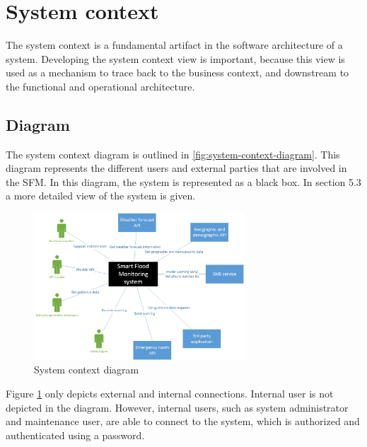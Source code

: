 \section{System context}
\label{sec:system-context}
The system context is a fundamental artifact in the software architecture of a system. Developing the system context view is important, because this view is used as a mechanism to trace back to the business context, and downstream to the functional and operational architecture.

\subsection{Diagram}
\label{subsec:system-diagram}
The system context diagram is outlined in \autoref{fig:system-context-diagram}. This diagram represents the different users and external parties that are involved in the SFM. In this diagram, the system is represented as a black box. In section 5.3 a more detailed view of the system is given. 

\begin{figure}[H]
	\centering
	\includegraphics[keepaspectratio=true,width=0.7\textwidth]{images/system_context.png}
	\caption{System context diagram}
	\label{fig:system-context-diagram}
\end{figure}

Figure \ref{fig:system-context-diagram} only depicts external and internal connections. Internal user is not depicted in the diagram. However, internal users, such as system administrator and maintenance user, are able to connect to the system, which is authorized and authenticated using a password.

